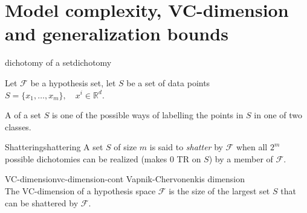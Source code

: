 \section{Model complexity, VC-dimension and generalization bounds}

\begin{definition}{dichotomy of a set}{dichotomy}

  Let $\mathcal{F}$ be a hypothesis set, let $S$ be a set of data points $S =
  \{x_1, \ldots, x_m\},\quad x^i \in \mathds{R}^d$.

  A  of a set
  $S$ is one of the possible ways of labelling the points in $S$ in
  one of two classes.

\end{definition}

\begin{definition}{Shattering}{shattering}
  A set $S$ of size $m$ is said to \emph{shatter} by $\mathcal{F}$
  when all $2^m$ possible dichotomies can be realized (makes 0 TR on $S$)
  by a member of
  $\mathcal{F}$.
\end{definition}

\begin{definition}{VC-dimension}{vc-dimension-cont}
  Vapnik-Chervonenkis dimension \\[1em]
  The VC-dimension of a hypothesis space $\mathcal{F}$ is the size
  of the largest set $S$ that can be shattered by $\mathcal{F}$.
\end{definition}

